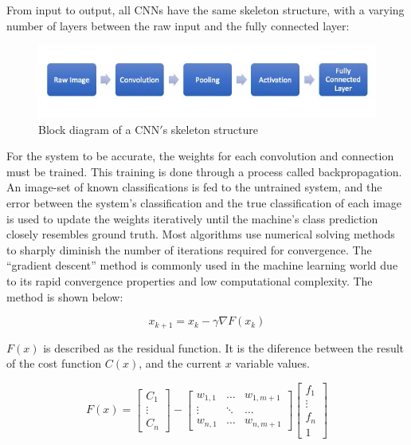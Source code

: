 \documentclass[12pt]{drexelthesis}
\begin{document}
From input to output, all CNNs have the same skeleton structure, with a varying number of layers between the raw input and the fully connected layer:

\begin{figure}[!ht]
	\centering
		\includegraphics[width=6in]{cnn_flow.png} 
	\caption[Block diagram of CNN flow]{\centering Block diagram of a CNN$'$s skeleton structure}
\end{figure}

For the system to be accurate, the weights for each convolution and connection must be trained. This training is done through a process called backpropagation. An image-set of known classifications is fed to the untrained system, and the error between the system’s classification and the true classification of each image is used to update the weights iteratively until the machine’s class prediction closely resembles ground truth. Most algorithms use numerical solving methods to sharply diminish the number of iterations required for convergence. The “gradient descent” method is commonly used in the machine learning world due to its rapid convergence properties and low computational complexity. The method is shown below:

\begin{equation}
	x_{k+1} = x_{k} - \gamma \nabla F(x_{k})
\end{equation}

$F(x)$ is described as the residual function. It is the diference between the result of the cost function $C(x)$, and the current $x$ variable values.

\begin{equation}
 F(x) =
\begin{bmatrix}
C_{1} \\
\vdots \\
C_{n}
\end{bmatrix}  -  \begin{bmatrix} w_{1,1} & \hdots & w_{1,m+1} \\ \vdots & \ddots & \hdots \\ w_{n,1} & \hdots & w_{n, m+1} \end{bmatrix}  \begin{bmatrix} f_{1} \\ \vdots \\ f_{n} \\ 1 \end{bmatrix} 
\end{equation}
\end{document}
